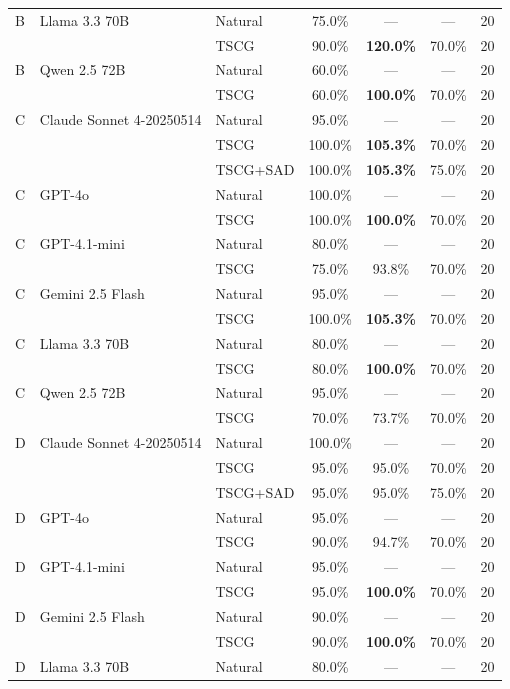\begin{table}[htbp]
\begin{tabular}{lllcccr}
    B & Llama 3.3 70B & Natural & 75.0\% & --- & --- & 20 \\
    & & TSCG & 90.0\% & \textbf{120.0\%} & 70.0\% & 20 \\
    B & Qwen 2.5 72B & Natural & 60.0\% & --- & --- & 20 \\
    & & TSCG & 60.0\% & \textbf{100.0\%} & 70.0\% & 20 \\
    \addlinespace
    C & Claude Sonnet 4-20250514 & Natural & 95.0\% & --- & --- & 20 \\
    & & TSCG & 100.0\% & \textbf{105.3\%} & 70.0\% & 20 \\
    & & TSCG+SAD & 100.0\% & \textbf{105.3\%} & 75.0\% & 20 \\
    C & GPT-4o & Natural & 100.0\% & --- & --- & 20 \\
    & & TSCG & 100.0\% & \textbf{100.0\%} & 70.0\% & 20 \\
    C & GPT-4.1-mini & Natural & 80.0\% & --- & --- & 20 \\
    & & TSCG & 75.0\% & 93.8\% & 70.0\% & 20 \\
    C & Gemini 2.5 Flash & Natural & 95.0\% & --- & --- & 20 \\
    & & TSCG & 100.0\% & \textbf{105.3\%} & 70.0\% & 20 \\
    C & Llama 3.3 70B & Natural & 80.0\% & --- & --- & 20 \\
    & & TSCG & 80.0\% & \textbf{100.0\%} & 70.0\% & 20 \\
    C & Qwen 2.5 72B & Natural & 95.0\% & --- & --- & 20 \\
    & & TSCG & 70.0\% & 73.7\% & 70.0\% & 20 \\
    \addlinespace
    D & Claude Sonnet 4-20250514 & Natural & 100.0\% & --- & --- & 20 \\
    & & TSCG & 95.0\% & 95.0\% & 70.0\% & 20 \\
    & & TSCG+SAD & 95.0\% & 95.0\% & 75.0\% & 20 \\
    D & GPT-4o & Natural & 95.0\% & --- & --- & 20 \\
    & & TSCG & 90.0\% & 94.7\% & 70.0\% & 20 \\
    D & GPT-4.1-mini & Natural & 95.0\% & --- & --- & 20 \\
    & & TSCG & 95.0\% & \textbf{100.0\%} & 70.0\% & 20 \\
    D & Gemini 2.5 Flash & Natural & 90.0\% & --- & --- & 20 \\
    & & TSCG & 90.0\% & \textbf{100.0\%} & 70.0\% & 20 \\
    D & Llama 3.3 70B & Natural & 80.0\% & --- & --- & 20 \\

\end{tabular}
\end{table}
